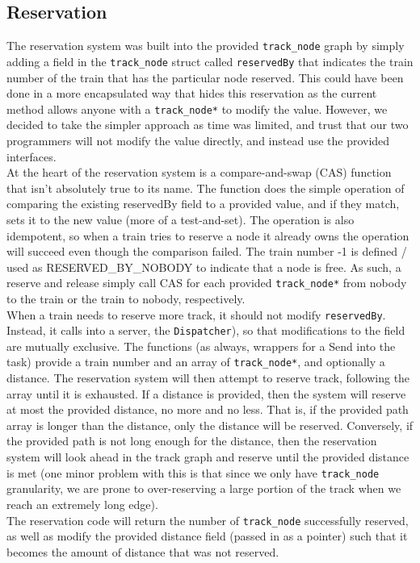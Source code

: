 \documentclass[12pt]{article}
\begin{document}
\subsection{Reservation}
The reservation system was built into the provided \texttt{track\_node} graph by simply adding a field in the
\texttt{track\_node} struct called \texttt{reservedBy} that indicates the train number of the train that has the
particular node reserved. This could have been done in a more encapsulated way that hides this reservation as the
current method allows anyone with a \texttt{track\_node*} to modify the value. However, we decided to take the simpler
approach as time was limited, and trust that our two programmers will not modify the value directly, and instead use the
provided interfaces.
\\
At the heart of the reservation system is a compare-and-swap (CAS) function that isn't absolutely true to its name. The
function does the simple operation of comparing the existing reservedBy field to a provided value, and if they match,
sets it to the new value (more of a test-and-set). The operation is also idempotent, so when a train tries to reserve a
node it already owns the operation will succeed even though the comparison failed. The train number -1 is defined / used as
RESERVED\_BY\_NOBODY to indicate that a node is free. As such, a reserve and release simply call CAS for each provided
\texttt{track\_node*} from nobody to the train or the train to nobody, respectively.
\\
When a train needs to reserve more track, it should not modify \texttt{reservedBy}. Instead, it calls into a server,
the \texttt{Dispatcher}), so that modifications to the field are mutually exclusive. The functions (as always, wrappers
for a Send into the task) provide a train number and an array of \texttt{track\_node*}, and optionally a distance. The 
reservation system will then attempt to reserve track, following the array until it is exhausted. If a distance is
provided, then the system will reserve at most the provided distance, no more and no less. That is, if the provided path
array is longer than the distance, only the distance will be reserved. Conversely, if the provided path is not long
enough for the distance, then the reservation system will look ahead in the track graph and reserve until the provided
distance is met (one minor problem with this is that since we only have \texttt{track\_node} granularity, we are prone
to over-reserving a large portion of the track when we reach an extremely long edge).
\\
The reservation code will return the number of \texttt{track\_node} successfully reserved, as well as modify the
provided distance field (passed in as a pointer) such that it becomes the amount of distance that was not reserved.
\end{document}
